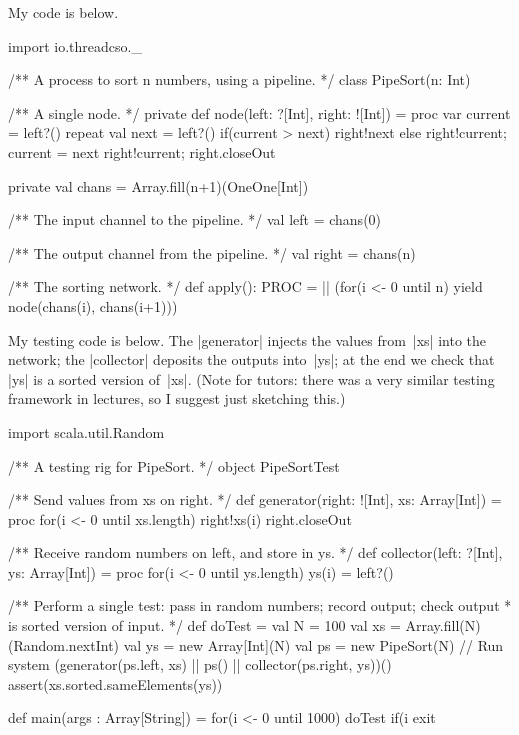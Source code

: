 \begin{answer}
My code is below.  
%
\begin{scala}
import io.threadcso._

/** A process to sort n numbers, using a pipeline. */
class PipeSort(n: Int){
  /** A single node. */
  private def node(left: ?[Int], right: ![Int]) = proc{
    var current = left?()
    repeat{
      val next = left?()
      if(current > next) right!next
      else { right!current; current = next }
    }
    right!current; right.closeOut
  }

  private val chans = Array.fill(n+1)(OneOne[Int])

  /** The input channel to the pipeline. */
  val left = chans(0)

  /** The output channel from the pipeline. */
  val right = chans(n)

  /** The sorting network. */
  def apply(): PROC = || (for(i <- 0 until n) yield node(chans(i), chans(i+1)))
}
\end{scala}

My testing code is below.  The |generator| injects the values from~|xs| into
the network; the |collector| deposits the outputs into~|ys|; at the end we
check that |ys| is a sorted version of~|xs|.  (Note for tutors: there was a
very similar testing framework in lectures, so I suggest just sketching this.)
%
\begin{scala}
import scala.util.Random

/** A testing rig for PipeSort. */
object PipeSortTest{
  /** Send values from xs on right. */
  def generator(right: ![Int], xs: Array[Int]) = proc{
    for(i <- 0 until xs.length) right!xs(i)
    right.closeOut
  }

  /** Receive random numbers on left, and store in ys. */
  def collector(left: ?[Int], ys: Array[Int]) = proc{
    for(i <- 0 until ys.length) ys(i) = left?()
  }

  /** Perform a single test: pass in random numbers; record output; check output
    * is sorted version of input. */
  def doTest = {
    val N = 100
    val xs = Array.fill(N)(Random.nextInt)
    val ys = new Array[Int](N)
    val ps = new PipeSort(N)
    // Run system
    (generator(ps.left, xs) || ps() || collector(ps.right, ys))()
    assert(xs.sorted.sameElements(ys))
  }

  def main(args : Array[String]) = {
    for(i <- 0 until 1000){
      doTest
      if(i%
    }
    exit
  }
}
\end{scala}


\end{answer}
